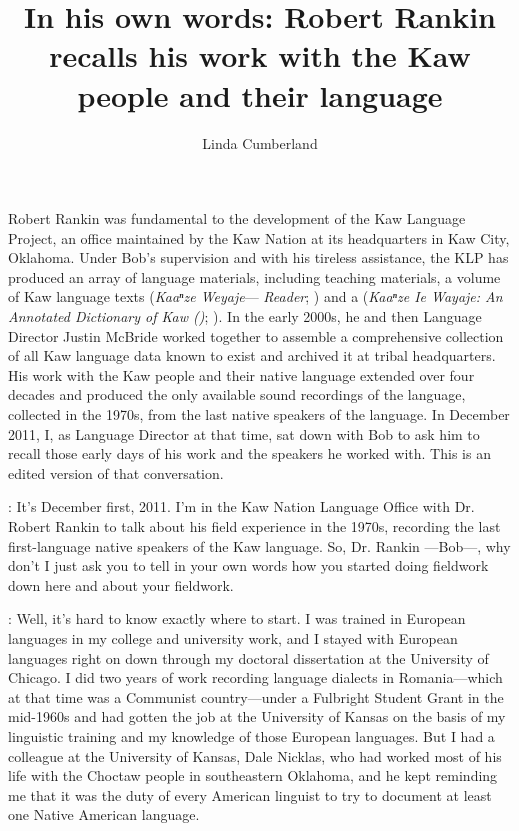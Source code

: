 \documentclass[output=paper]{LSP/langsci}
\author{Linda Cumberland}
\title{In his own words: {Robert Rankin} recalls his work with the {Kaw} people and their language}
\begin{document}
Robert Rankin was fundamental to the development of the Kaw Language Project, an office maintained by the Kaw Nation at its headquarters in Kaw City, Oklahoma. Under Bob's supervision and with his tireless assistance, the KLP has produced an array of language materials, including teaching materials, a volume of Kaw language texts (\textit{Kaaⁿze Weyaje}---\textit{ Reader}; \citealt{KanzaLP2010}) and a  (\textit{Kaaⁿze Ie Wayaje: An Annotated Dictionary of Kaw ()}; \citealt{CumberlandRankin2012}). In the early 2000s, he and then Language Director Justin McBride worked together to assemble a comprehensive collection of all Kaw language data known to exist and archived it at tribal headquarters. His work with the Kaw people and their native language extended over four decades and produced the only available sound recordings of the language, collected in the 1970s, from the last native speakers of the language. In December 2011, I, as Language Director at that time, sat down with Bob to ask him to recall those early days of his work and the speakers he worked with. This is an edited version of that conversation.

: It's December first, 2011. I'm in the Kaw Nation Language Office with Dr. Robert Rankin to talk about his field experience in the 1970s, recording the last first-language native speakers of the Kaw language. So, Dr. Rankin ---Bob---, why don't I just ask you to tell in your own words how you started doing fieldwork down here and about your fieldwork. 

:  Well, it's hard to know exactly where to start. I was trained in European languages in my college and university work, and I stayed with European languages right on down through my doctoral dissertation at the University of Chicago. I did two years of work recording  language dialects in Romania---which at that time was a Communist country---under a Fulbright Student Grant in the mid-1960s and had gotten the job at the University of Kansas on the basis of my linguistic training and my knowledge of those European languages. But I had a colleague at the University of Kansas, Dale Nicklas, who had worked most of his life with the Choctaw people in southeastern Oklahoma, and he kept reminding me that it was the duty of every American linguist to try to document at least one Native American language. 
\end{document}
